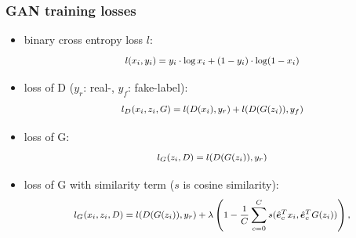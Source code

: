 \begin{frame}
  \frametitle{GAN training losses}
  \begin{itemize}
    \item binary cross entropy loss $l$:
    \begin{equation*}
      \footnotesize
      \begin{aligned}
        l(x_i, y_i) = y_i \cdot \log x_i + (1 - y_i) \cdot \log (1 - x_i)
      \end{aligned}
    \end{equation*}
    \item loss of D ($y_r$: real-, $y_f$: fake-label):
    \begin{equation*}
      \footnotesize
      \begin{aligned}
        l_D(x_i, z_i, G) = l(D(x_i), y_r) + l(D(G(z_i)), y_f)
      \end{aligned}
    \end{equation*}
    \item loss of G:
    \begin{equation*}
      \footnotesize
      \begin{aligned}
        l_G(z_i, D) =  l(D(G(z_i)), y_r)
      \end{aligned}
    \end{equation*}
    \item loss of G with similarity term ($s$ is cosine similarity):
    \begin{equation*}
      \footnotesize
      \begin{aligned}
        l_G(x_i, z_i, D) =  l(D(G(z_i)), y_r) + \lambda \left(1 - \frac{1}{C} \sum_{c=0}^{C} s(\hat{\bm{e}}_c^T x_i , \hat{\bm{e}}_c^T G(z_i)) \right),
      \end{aligned}
    \end{equation*}
  \end{itemize}
\end{frame}


